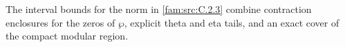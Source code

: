 \begin{remark}
\hypertarget{tag-034N}{}\label{push:section:E.4}
\label{sec:e4}
\hypertarget{tag-033L}{}\label{push:src:E.4.1}
\hypertarget{tag-033M}{}\label{push:src:E.4.2}
The interval bounds for the norm in \cref{fam:src:C.2.3} combine
contraction enclosures for the zeros of $\wp$, explicit theta and eta
tails, and an exact cover of the compact modular region.
\end{remark}